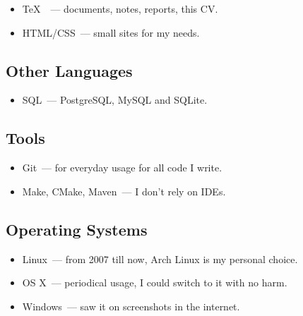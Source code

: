       \begin{itemize}

        \item \TeX\ ~--- documents, notes, reports, this CV.

        \item HTML/CSS~--- small sites for my needs.

      \end{itemize}

    \subsection*{Other Languages}

      \begin{itemize}

        \item SQL~--- PostgreSQL, MySQL and SQLite.

      \end{itemize}

    \subsection*{Tools}

      \begin{itemize}

        \item Git~--- for everyday usage for all code I write.

        \item Make, CMake, Maven~--- I don’t rely on IDEs.

      \end{itemize}

    \subsection*{Operating Systems}

      \begin{itemize}

        \item Linux~--- from 2007 till now, Arch Linux is my personal choice.

        \item OS X~--- periodical usage, I could switch to it with no harm.

        \item Windows~--- saw it on screenshots in the internet.

      \end{itemize}


